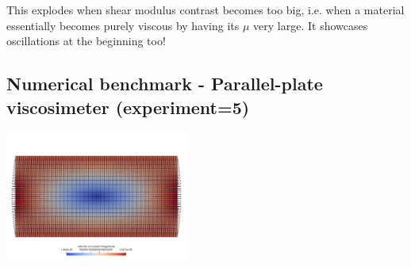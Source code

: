 {\color{red}This explodes when shear modulus contrast becomes too big, i.e. when a material 
essentially becomes purely viscous by having its $\mu$ very large. }
It showcases oscillations at the beginning too!





\newpage
\subsection*{Numerical benchmark - Parallel-plate viscosimeter (experiment=5)}

\begin{center}
\includegraphics[width=6cm]{python_codes/fieldstone_129/results/experiment5/setup}
\end{center}


